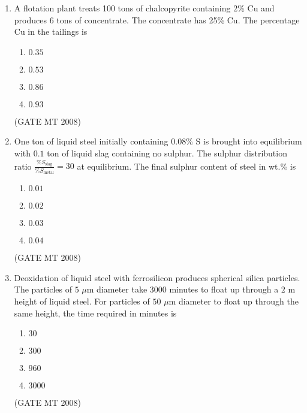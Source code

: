 \documentclass[11pt, letterpaper]{article}
\theoremstyle{remark}
\begin{document}
\begin{enumerate}[label=Q.\arabic*]
\item A flotation plant treats 100 tons of chalcopyrite containing 2\% Cu and produces 6 tons of concentrate. 
    The concentrate has 25\% Cu. The percentage Cu in the tailings is
    \vspace{-0.9em}
    \begin{multicols}{4}
        \begin{enumerate}[label=(\MakeUppercase{\alph*})]
            \item $0.35 $
            \item $0.53$ 
            \item $0.86$ 
            \item $0.93$
        \end{enumerate}
    \end{multicols}
    \vspace{-5mm}
 \hfill(GATE MT 2008)
 
    \item One ton of liquid steel initially containing $0.08$\% S is brought into equilibrium with $0.1$ ton of liquid slag containing no sulphur. The sulphur distribution ratio 
        $\displaystyle \frac{\%S_{\text{slag}}}{\%S_{\text{metal}}} = 30$ 
    at equilibrium. The final sulphur content of steel in wt.\% is
    \vspace{-0.9em}
    \begin{multicols}{4}
        \begin{enumerate}[label=(\MakeUppercase{\alph*})]
            \item $0.01$ 
            \item $0.02$ 
            \item $0.03$ 
            \item $0.04$
        \end{enumerate}
    \end{multicols}
    \vspace{-5mm}
  \hfill(GATE MT 2008)  
    \item Deoxidation of liquid steel with ferrosilicon produces spherical silica particles. 
    The particles of $5$ $\mu$m diameter take $3000$ minutes to float up through a $2$ m height of liquid steel. 
    For particles of $50$ $\mu$m diameter to float up through the same height, the time required in minutes is
    \vspace{-0.9em}
    \begin{multicols}{4}
        \begin{enumerate}[label=(\MakeUppercase{\alph*})]
            \item $30$ 
            \item $300$ 
            \item $960$ 
            \item $3000$
        \end{enumerate}
    \end{multicols}
    \vspace{-5mm}
\hfill(GATE MT 2008)
  

\end{enumerate}
\end{document}
